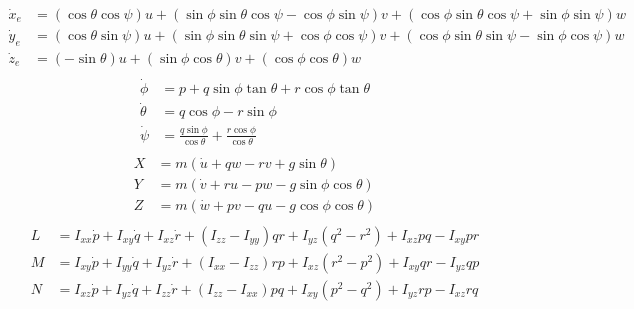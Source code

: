 \begin{example}
    \begin{equation}
        \begin{aligned}
            \dot{x}_e &= (\cos \theta \cos \psi) u + (\sin \phi \sin \theta \cos \psi - \cos \phi \sin \psi) v + (\cos \phi \sin \theta \cos \psi + \sin \phi \sin \psi) w \\
            \dot{y}_e &= (\cos \theta \sin \psi) u + (\sin \phi \sin \theta \sin \psi + \cos \phi \cos \psi) v + (\cos \phi \sin \theta \sin \psi - \sin \phi \cos \psi) w \\
            \dot{z}_e &= (- \sin \theta) u + (\sin \phi \cos \theta) v + (\cos \phi \cos \theta) w \\
        \end{aligned}
        \label{eq:rigid-body-eom-1}
    \end{equation}
    \begin{equation}
        \begin{aligned}
            \dot{\phi} &= p + q \sin \phi \tan \theta + r \cos \phi \tan \theta \\
            \dot{\theta} &= q \cos \phi - r \sin \phi \\
            \dot{\psi} &= \frac{q \sin \phi}{\cos \theta} + \frac{r \cos \phi}{\cos \theta} \\
        \end{aligned}
        \label{eq:rigid-body-eom-2}
    \end{equation}
    \begin{equation}
        \begin{aligned}
            X &= m (\dot{u} + qw - rv + g \sin \theta) \\
            Y &= m (\dot{v} + ru - pw - g \sin \phi \cos \theta) \\
            Z &= m (\dot{w} + pv - qu - g \cos \phi \cos \theta) \\
        \end{aligned}
        \label{eq:rigid-body-eom-3}
    \end{equation}
    \begin{equation}
        \begin{aligned}
            L &= I_{xx} \dot{p} + I_{xy} \dot{q} + I_{xz} \dot{r} + (I_{zz}-I_{yy}) qr + I_{yz} (q^2-r^2) + I_{xz} pq - I_{xy} pr \\
            M &= I_{xy} \dot{p} + I_{yy} \dot{q} + I_{yz} \dot{r} + (I_{xx}-I_{zz}) rp + I_{xz} (r^2-p^2) + I_{xy} qr - I_{yz} qp \\
            N &= I_{xz} \dot{p} + I_{yz} \dot{q} + I_{zz} \dot{r} + (I_{zz}-I_{xx}) pq + I_{xy} (p^2-q^2) + I_{yz} rp - I_{xz} rq \\
        \end{aligned}
        \label{eq:rigid-body-eom-4}
    \end{equation}
\end{example}

